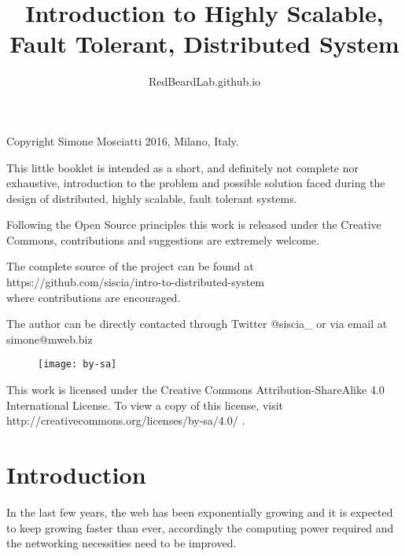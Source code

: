 \documentclass[12pt]{article} %
\title{{\rmfamily Introduction to Highly Scalable, Fault Tolerant, Distributed System}}
\author{RedBeardLab.github.io}
\date{} %
\begin{document}

\maketitle

\newpage

{Copyright Simone Mosciatti 2016, Milano, Italy.}

This little booklet is intended as a short, and definitely not complete nor exhaustive, introduction to the problem and possible solution faced during the design of distributed, highly scalable, fault tolerant systems.

Following the Open Source principles this work is released under the Creative Commons, contributions and suggestions are extremely welcome. 

The complete source of the project can be found at \\
{\ttfamily https://github.com/siscia/intro-to-distributed-system} \\
where contributions are encouraged.

The author can be directly contacted through Twitter {\ttfamily @siscia\_} or via email at {\ttfamily simone@mweb.biz}

\vspace{\fill}

\begin{figure}[h]
	\centering
	\texttt{[image: by-sa]}
\end{figure}

{\small This work is licensed under the Creative Commons Attribution-ShareAlike 4.0 International License. To view a copy of this license, visit {\ttfamily http://creativecommons.org/licenses/by-sa/4.0/} .}

\section{Introduction}

In the last few years, the web has been exponentially growing and it is expected to keep growing faster than ever, accordingly the computing power required and the networking necessities need to be improved.
\end{document}
